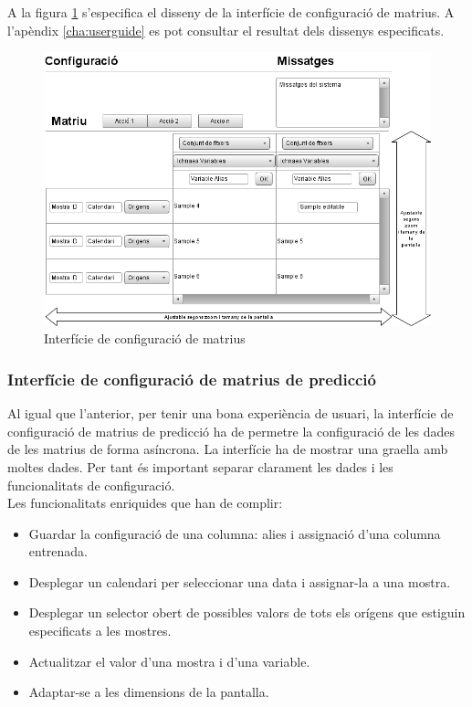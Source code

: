 A la figura \ref{fig:interfacematrixconf} s'especifica el disseny de la interfície de configuraci\'{o} de matrius. A l'apèndix \ref{cha:userguide} es pot consultar el resultat dels dissenys especificats.

\begin{figure}[H]
  \centering
  \includegraphics[scale=0.5]{img/design/Interficiedeconfiguracio.png}
  \caption{Interfície de configuració de matrius}
  \label{fig:interfacematrixconf}
\end{figure}


\subsubsection{Interf\'{i}cie de configuraci\'{o} de matrius de predicció}
Al igual que l'anterior, per tenir una bona experiència de usuari, la interfície de configuració de matrius de predicció ha de permetre la configuració de les dades de les matrius de forma asíncrona. La interfície ha de mostrar una graella amb moltes dades. Per tant \'{e}s important separar clarament les dades i les funcionalitats de configuració.\\

Les funcionalitats enriquides que han de complir:
\begin{itemize}
\item Guardar la configuració de una columna: alies i assignació d'una columna entrenada.
\item Desplegar un calendari per seleccionar una data i assignar-la a una mostra.
\item Desplegar un selector obert de possibles valors de tots els orígens que estiguin especificats a les mostres.
\item Actualitzar el valor d'una mostra i d'una variable.
\item Adaptar-se a les dimensions de la pantalla.
\end{itemize}


